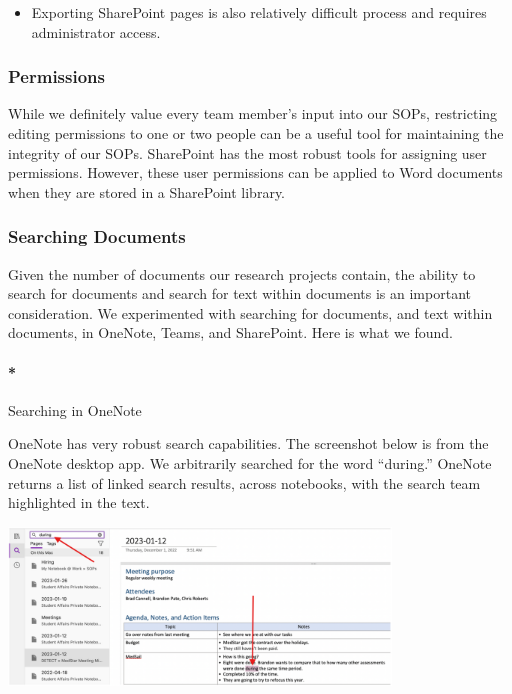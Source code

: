\documentclass[
  letterpaper,
  DIV=11,
  numbers=noendperiod]{scrreprt}
\let\oldparagraph\paragraph
\renewcommand{\paragraph}[1]{\oldparagraph{#1}\mbox{}}
\providecommand{\tightlist}{%
  \setlength{\itemsep}{0pt}\setlength{\parskip}{0pt}}\usepackage{longtable,booktabs,array}
\begin{document}
\begin{itemize}
\tightlist
\item
  Exporting SharePoint pages is also relatively difficult process and
  requires administrator access.
\end{itemize}

\subsubsection*{Permissions}\label{permissions}

While we definitely value every team member's input into our SOPs,
restricting editing permissions to one or two people can be a useful
tool for maintaining the integrity of our SOPs. SharePoint has the most
robust tools for assigning user permissions. However, these user
permissions can be applied to Word documents when they are stored in a
SharePoint library.

\subsubsection*{Searching Documents}\label{searching-documents}

Given the number of documents our research projects contain, the ability
to search for documents and search for text within documents is an
important consideration. We experimented with searching for documents,
and text within documents, in OneNote, Teams, and SharePoint. Here is
what we found.

\paragraph*{Searching in OneNote}\label{searching-in-onenote}

OneNote has very robust search capabilities. The screenshot below is
from the OneNote desktop app. We arbitrarily searched for the word
``during.'' OneNote returns a list of linked search results, across
notebooks, with the search team highlighted in the text.

\begin{center}
\includegraphics[width=4in,height=\textheight]{chapters/authoring_sops/../../graphics/one_note.png}
\end{center}
\end{document}
